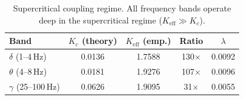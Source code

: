 \begin{table}[t]
\centering
\caption{Supercritical coupling regime. All frequency bands operate deep in the supercritical regime ($K_{\mathrm{eff}} \gg K_c$).}
\label{tab:supercritical}
\begin{tabular}{lcccc}
\toprule
Band & $K_c$ (theory) & $K_{\mathrm{eff}}$ (emp.) & Ratio & $\lambda$ \\
\midrule
$\delta$ (1--4\,Hz) & 0.0136 & 1.7588 & 130$\times$ & 0.0092 \\
$\theta$ (4--8\,Hz) & 0.0181 & 1.9276 & 107$\times$ & 0.0096 \\
$\gamma$ (25--100\,Hz) & 0.0626 & 1.9095 & 31$\times$ & 0.0055 \\
\bottomrule
\end{tabular}
\end{table}